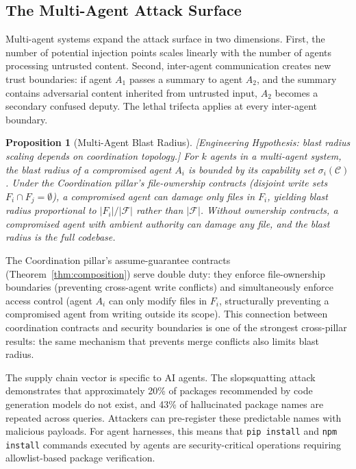 \documentclass[11pt, a4paper]{googledeepmind}
\newtheorem{proposition}{Proposition}[section]
\begin{document}
\subsection{The Multi-Agent Attack Surface}

Multi-agent systems expand the attack surface in two dimensions. First, the number of potential injection points scales linearly with the number of agents processing untrusted content. Second, inter-agent communication creates new trust boundaries: if agent $A_1$ passes a summary to agent $A_2$, and the summary contains adversarial content inherited from untrusted input, $A_2$ becomes a secondary confused deputy. The lethal trifecta \citep{willison2024trifecta} applies at every inter-agent boundary.

\begin{proposition}[Multi-Agent Blast Radius]
\emph{[Engineering Hypothesis: blast radius scaling depends on coordination topology.]}
\label{prop:multi-agent-blast}
For $k$ agents in a multi-agent system, the blast radius of a compromised agent $A_i$ is bounded by its capability set $\sigma_i(\mathcal{C})$. Under the Coordination pillar's file-ownership contracts (disjoint write sets $F_i \cap F_j = \emptyset$), a compromised agent can damage only files in $F_i$, yielding blast radius proportional to $|F_i| / |\mathcal{F}|$ rather than $|\mathcal{F}|$. Without ownership contracts, a compromised agent with ambient authority can damage any file, and the blast radius is the full codebase.
\end{proposition}

The Coordination pillar's assume-guarantee contracts (Theorem~\ref{thm:composition}) serve double duty: they enforce file-ownership boundaries (preventing cross-agent write conflicts) and simultaneously enforce access control (agent $A_i$ can only modify files in $F_i$, structurally preventing a compromised agent from writing outside its scope). This connection between coordination contracts and security boundaries is one of the strongest cross-pillar results: the same mechanism that prevents merge conflicts also limits blast radius.

The supply chain vector is specific to AI agents. The slopsquatting attack \citep{lanyado2025slopsquatting} demonstrates that approximately 20\% of packages recommended by code generation models do not exist, and 43\% of hallucinated package names are repeated across queries. Attackers can pre-register these predictable names with malicious payloads. For agent harnesses, this means that \texttt{pip install} and \texttt{npm install} commands executed by agents are security-critical operations requiring allowlist-based package verification.
\end{document}

